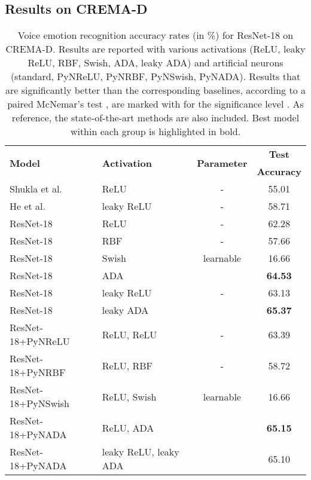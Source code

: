\documentclass[pdflatex,sn-mathphys]{sn-jnl}
\theoremstyle{thmstyleone}
\theoremstyle{thmstyletwo}\newtheorem{example}{Example}\newtheorem{remark}{Remark}
\theoremstyle{thmstylethree}\newtheorem{definition}{Definition}\DeclareMathOperator{\sinc}{sinc}
\begin{document}
\subsection{Results on CREMA-D}
\label{sec_results_crema}

\begin{table}[!t] 
\caption{Voice emotion recognition accuracy rates (in \%) for ResNet-18 on CREMA-D. Results are reported with various activations (ReLU, leaky ReLU, RBF, Swish, ADA, leaky ADA) and artificial neurons (standard, PyNReLU, PyNRBF, PyNSwish, PyNADA). Results that are significantly better than the corresponding baselines, according to a paired McNemar's test \citep{Dietterich-NC-1998}, are marked with  for the significance level . As reference, the state-of-the-art methods are also included. Best model within each group is highlighted in bold.}
\label{tab_cremaD}
\small{
\begin{center}
\begin{tabular}{llcc}
\toprule
\multirow{2}{*}{\bf Model}              & \multirow{2}{*}{\bf Activation}    & \multirow{2}{*}{\bf Parameter}           & {\bf Test}\\
              &     &          & {\bf Accuracy}\\
\midrule
Shukla et al.~\cite{Shukla-ICASSP-2020}             & ReLU	            & -	            	        & 55.01\\
He et al.~\cite{He-CVPRW-2020}             & leaky ReLU		            & -	            	        & 58.71\\
\midrule
ResNet-18                             & ReLU		        & -	            	        & 62.28\\
ResNet-18                             & RBF	                & -                         & 57.66\\
ResNet-18                             & Swish	            & learnable         & 16.66\\
ResNet-18                             & ADA 		        &               & {\bf 64.53}\\
\midrule
ResNet-18                             & leaky ReLU	        & -             	        & 63.13\\
ResNet-18                             & leaky ADA 	        & 	            & {\bf 65.37}\\
\midrule
ResNet-18+PyNReLU                     & ReLU, ReLU 	        & -	                        & 63.39\\
ResNet-18+PyNRBF                      & ReLU, RBF 	        & -	                        & 58.72\\
ResNet-18+PyNSwish                    & ReLU, Swish 	    & learnable         & 16.66\\
ResNet-18+PyNADA                      & ReLU, ADA 	        & 	            & {\bf 65.15}\\
ResNet-18+PyNADA                      & leaky ReLU, leaky ADA &             & 65.10\\
\bottomrule
\end{tabular}
\end{center}
}
\end{table}
\end{document}
